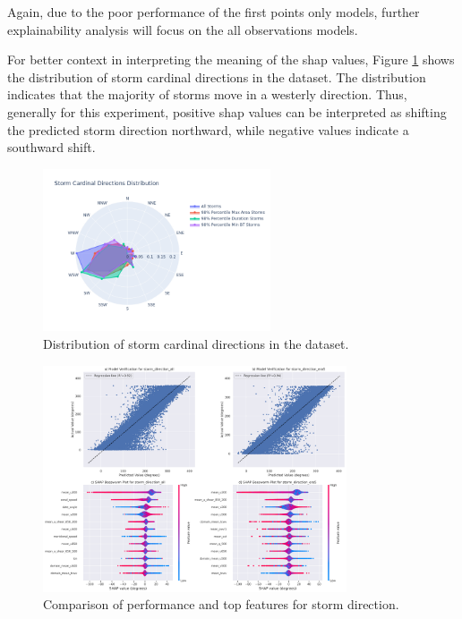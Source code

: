 Again, due to the poor performance of the first points only models, further explainability analysis will focus on the all observations models.

For better context in interpreting the meaning of the \acrshort{shap} values, Figure \ref{fig:storm_cardinal_directions_distribution} shows the distribution of storm cardinal directions in the dataset. The distribution indicates that the majority of storms move in a westerly direction. Thus, generally for this experiment, positive \acrshort{shap} values can be interpreted as shifting the predicted storm direction northward, while negative values indicate a southward shift.

\begin{figure}[ht]
    \centering
    \includegraphics[width=0.6\textwidth]{../figures/generated/exploration/storm_cardinal_directions_distribution.png}
    \caption{Distribution of storm cardinal directions in the dataset.}
    \label{fig:storm_cardinal_directions_distribution}
\end{figure}

\begin{figure}[ht]
    \centering
    \includegraphics[width=0.8\textwidth]{../figures/generated/experiments/storm_direction/storm_direction_summary.png}
    \caption{Comparison of performance and top features for storm direction.}
    \label{fig:storm_direction_summary}
\end{figure}

